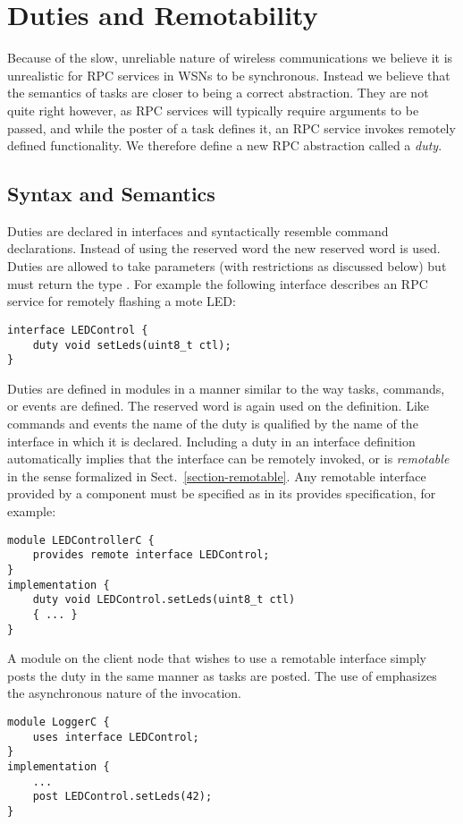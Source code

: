 \section{Duties and Remotability}
\label{section-duties}

Because of the slow, unreliable nature of wireless communications we believe it is unrealistic
for RPC services in WSNs to be synchronous. Instead we believe that the semantics of tasks are
closer to being a correct abstraction. They are not quite right however, as RPC services will
typically require arguments to be passed, and while the poster of a task defines it, an RPC
service invokes remotely defined functionality. We therefore define a new RPC abstraction called
a \emph{duty}.

\subsection{Syntax and Semantics}
\label{section-duties-syntax}

Duties are declared in interfaces and syntactically resemble command declarations. Instead of
using the reserved word  the new reserved word  is used. Duties are
allowed to take parameters (with restrictions as discussed below) but must return the type
. For example the following interface describes an RPC service for remotely flashing
a mote LED:
\begin{Verbatim}
interface LEDControl {
    duty void setLeds(uint8_t ctl);
}
\end{Verbatim}

Duties are defined in modules in a manner similar to the way tasks, commands, or events are
defined. The reserved word  is again used on the definition. Like commands and events
the name of the duty is qualified by the name of the interface in which it is declared.
Including a duty in an interface definition automatically implies that the interface can be
remotely invoked, or is \emph{remotable} in the sense formalized in
Sect.~\ref{section-remotable}. Any remotable interface provided by a component must be specified
as  in its provides specification, for example:
\begin{Verbatim}
module LEDControllerC {
    provides remote interface LEDControl;
}
implementation {
    duty void LEDControl.setLeds(uint8_t ctl)
    { ... }
}
\end{Verbatim}

A module on the client node that wishes to use a remotable interface simply posts the duty in
the same manner as tasks are posted. The use of  emphasizes the asynchronous nature
of the invocation.
\begin{Verbatim}
module LoggerC {
    uses interface LEDControl;
}
implementation {
    ...
    post LEDControl.setLeds(42);
}
\end{Verbatim}

